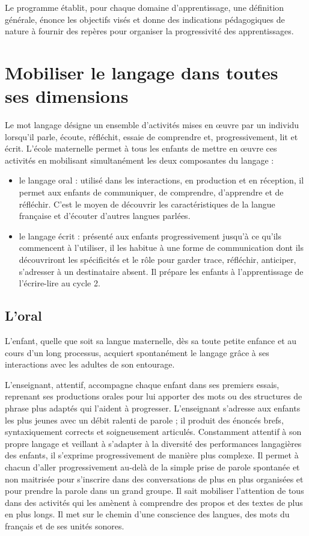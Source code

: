 Le programme établit, pour chaque domaine d’apprentissage, une définition générale, énonce les objectifs visés et donne des indications pédagogiques de nature à fournir des repères pour organiser la progressivité des apprentissages. 

\chapter{Mobiliser le langage dans toutes ses dimensions}
Le mot \og langage \fg{} désigne un ensemble d’activités mises en œuvre par un individu lorsqu’il parle, écoute, réfléchit, essaie de comprendre et, progressivement, lit et écrit. L’école maternelle permet à tous les enfants de mettre en œuvre ces activités en mobilisant simultanément les deux composantes du langage :
\begin{itemize}
\item le langage oral : utilisé dans les interactions, en production et en réception, il permet aux enfants de communiquer, de comprendre, d’apprendre et de réfléchir. C’est le moyen de découvrir les caractéristiques de la langue française et d’écouter d’autres langues parlées.
\item le langage écrit : présenté aux enfants progressivement jusqu’à ce qu’ils commencent à l’utiliser, il les habitue à une forme de communication dont ils découvriront les spécificités et le rôle pour garder trace, réfléchir, anticiper, s’adresser à un destinataire absent. Il prépare les enfants à l’apprentissage de l’écrire-lire au cycle 2.
\end{itemize}

\section{L’oral}
L’enfant, quelle que soit sa langue maternelle, dès sa toute petite enfance et au cours d’un long processus, acquiert spontanément le langage grâce à ses interactions avec les adultes de son entourage. 

L’enseignant, attentif, accompagne chaque enfant dans ses premiers essais, reprenant ses productions orales pour lui apporter des mots ou des structures de phrase plus adaptés qui l’aident à progresser. L’enseignant s’adresse aux enfants les plus jeunes avec un débit ralenti de parole ; il produit des énoncés brefs, syntaxiquement corrects et soigneusement articulés. Constamment attentif à son propre langage et veillant à s’adapter à la diversité des performances langagières des enfants, il s’exprime progressivement de manière plus complexe. Il permet à chacun d’aller progressivement au-delà de la simple prise de parole spontanée et non maitrisée pour s’inscrire dans des conversations de plus en plus organisées et pour prendre la parole dans un grand groupe. Il sait mobiliser l’attention de tous dans des activités qui les amènent à comprendre des propos et des textes de plus en plus longs. Il met sur le chemin d’une conscience des langues, des mots du français et de ses unités sonores.

